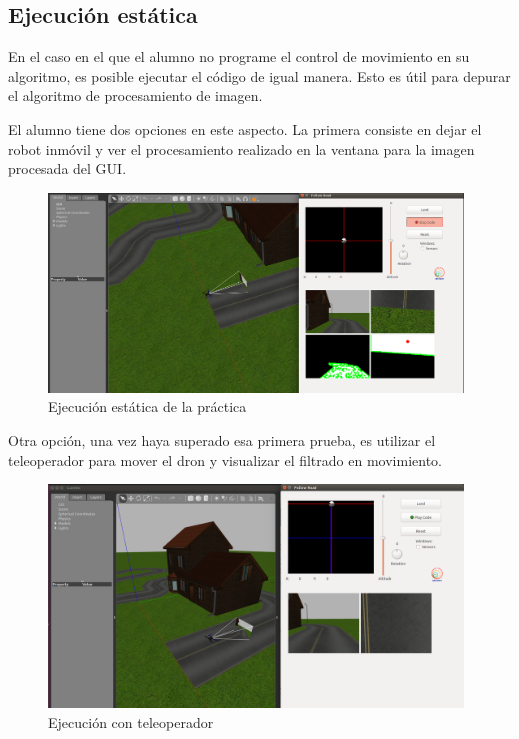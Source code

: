 \subsection{Ejecución estática}
En el caso en el que el alumno no programe el control de movimiento en su algoritmo, es posible ejecutar el código de igual manera. Esto es útil para depurar el algoritmo de procesamiento de imagen. 

El alumno tiene dos opciones en este aspecto. La primera consiste en dejar el robot inmóvil y ver el procesamiento realizado en la ventana para la imagen procesada del GUI. 

\begin{figure}[H]
  \begin{center}
    \includegraphics[width=0.98\textwidth]{figures/ejec_estat_fr.png}
		\caption{Ejecución estática de la práctica}
		\label{fig.eefr}
		\end{center}
\end{figure}

Otra opción, una vez haya superado esa primera prueba, es utilizar el teleoperador para mover el dron y visualizar el filtrado en movimiento.

\begin{figure}[H]
  \begin{center}
    \includegraphics[width=0.98\textwidth]{figures/ejec_teleop_fr.png}
		\caption{Ejecución con teleoperador}
		\label{fig.etelfr}
		\end{center}
\end{figure}

